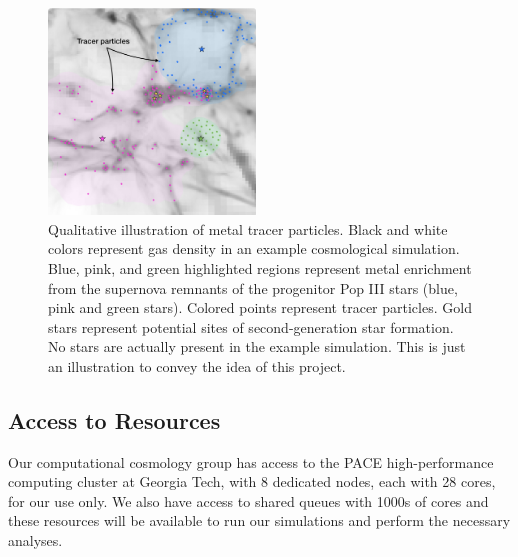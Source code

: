 \documentclass[a4paper, 12pt]{article}
\begin{document}
\begin{figure}
  \includegraphics[width=0.49\textwidth]{figures/tracer_final}
  \caption{Qualitative illustration of metal tracer particles. Black and white colors represent gas density in an example cosmological simulation. Blue, pink, and green highlighted regions represent metal enrichment from the supernova remnants of the progenitor Pop III stars (blue, pink and green stars). Colored points represent tracer particles. Gold stars represent potential sites of second-generation star formation. No stars are actually present in the example simulation. This is just an illustration to convey the idea of this project.}
  \label{fig:tracer}    
\end{figure}


\subsection{Access to Resources}

Our computational cosmology group has access to the PACE high-performance computing cluster at Georgia Tech, with 8 dedicated nodes, each with 28 cores, for our use only. We also have access to shared queues with 1000s of cores and these resources will be available to run our simulations and perform the necessary analyses. 
\end{document}
